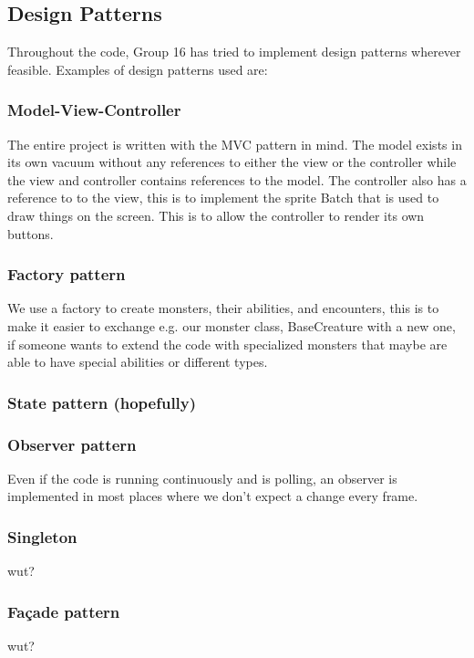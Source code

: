 \subsection{Design Patterns}
Throughout the code, Group 16 has tried to implement design patterns wherever feasible. Examples of design patterns used are:
\subsubsection{Model-View-Controller}
The entire project is written with the MVC pattern in mind. The model exists in its own vacuum without any references to either the view or the controller while the view and controller contains references to the model. The controller also has a reference to to the view, this is to implement the sprite Batch that is used to draw things on the screen. This is to allow the controller to render its own buttons.
\subsubsection{Factory pattern}
We use a factory to create monsters, their abilities, and encounters, this is to make it easier to exchange e.g. our monster class, BaseCreature with a new one, if someone wants to extend the code with specialized monsters that maybe are able to have special abilities or different types.
\subsubsection{State pattern (hopefully)}
\subsubsection{Observer pattern}
Even if the code is running continuously and is polling, an observer is implemented in most places where we don't expect a change every frame.
\subsubsection{Singleton}
wut?%
\subsubsection{Façade pattern}
wut?%
